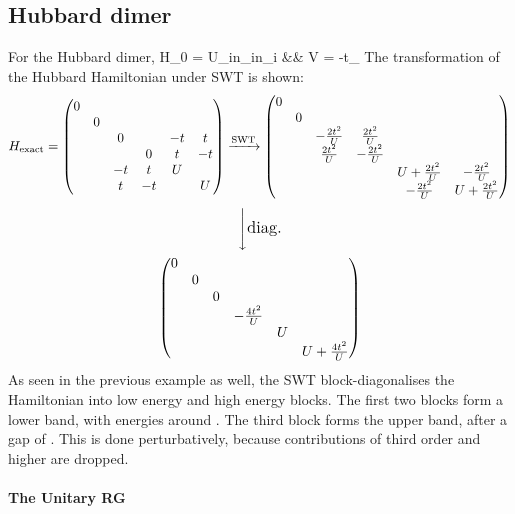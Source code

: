 \documentclass[12pt]{article}
\begin{document}
\subsection{Hubbard dimer}
For the Hubbard dimer,
\beq
H_0 = U\sum_in_{i\ua}n_{i\da} && V = -t\sum_\sigma{}
\eeq
The transformation of the Hubbard Hamiltonian under SWT is shown:
\begin{gather*}
H_{\text{exact}} = 
\begin{pmatrix}
	0 &&&&&\\
	& 0&&&&\\
	&& 0 && -t & t \\
	&&& 0 & t & -t \\
	&& -t & t & U & \\
	&& t & -t && U \\
\end{pmatrix}
\xrightarrow {\large{\text{SWT}}}
\begin{pmatrix}
	0 &&&&&\\
	& 0&&&&\\
	&& -\frac{2t^2}{U} & \frac{2t^2}{U} && \\
	&& \frac{2t^2}{U} & -\frac{2t^2}{U} && \\
	&&&& U+\frac{2t^2}{U} & -\frac{2t^2}{U} \\
	&&&& -\frac{2t^2}{U} & U+\frac{2t^2}{U} \\
\end{pmatrix}
\end{gather*}
\begin{gather*}
\Bigg\downarrow {\large{\text{diag.}}}\\
\begin{pmatrix}
	0 &&&&&\\
	& 0&&&&\\
	&& 0 &&& \\
	&&& -\frac{4t^2}{U} && \\
	&&&& U & \\
	&&&&& U+\frac{4t^2}{U} \\
\end{pmatrix}
\end{gather*}
As seen in the previous example as well, the SWT block-diagonalises the Hamiltonian into low energy and high energy blocks. The first two blocks form a lower band, with energies around . The third block forms the upper band, after a gap of . This is done perturbatively, because contributions of third order  and higher are dropped.

\paragraph{The Unitary RG} 
\end{document}
